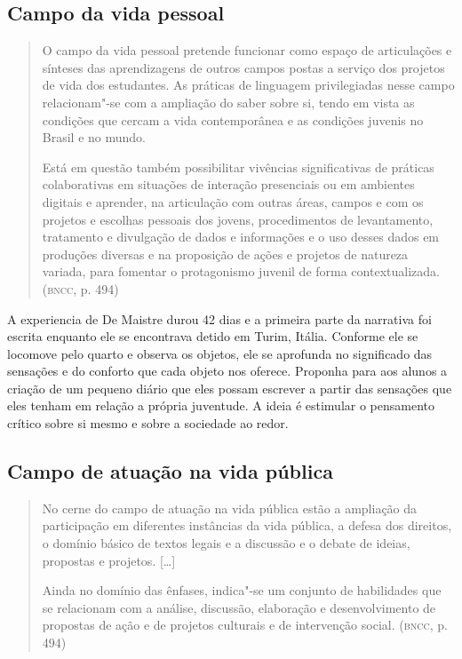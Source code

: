 \documentclass[12pt]{extarticle}
\begin{document}
\subsection{Campo da vida pessoal}

\begin{quote}
O campo da vida pessoal pretende funcionar como espaço de articulações
e sínteses das aprendizagens de outros campos postas a serviço dos
projetos de vida dos estudantes. As práticas de linguagem privilegiadas
nesse campo relacionam"-se com a ampliação do saber sobre si, tendo em
vista as condições que cercam a vida contemporânea e as condições
juvenis no Brasil e no mundo.

Está em questão também possibilitar vivências significativas de práticas
colaborativas em situações de interação presenciais ou em ambientes
digitais e aprender, na articulação com outras áreas, campos e com os
projetos e escolhas pessoais dos jovens, procedimentos de levantamento,
tratamento e divulgação de dados e informações e o uso desses dados em
produções diversas e na proposição de ações e projetos de natureza
variada, para fomentar o protagonismo juvenil de forma
contextualizada. (\textsc{bncc}, p. 494)
\end{quote}

A experiencia de De Maistre durou 42 dias e a primeira parte da
narrativa foi escrita enquanto ele se encontrava detido em Turim,
Itália. Conforme ele se locomove pelo quarto e observa os objetos, ele
se aprofunda no significado das sensações e do conforto que cada
objeto nos oferece. Proponha para aos alunos a criação de um pequeno
diário que eles possam escrever a partir das sensações que eles tenham
em relação a própria juventude. A ideia é estimular o pensamento
crítico sobre si mesmo e sobre a sociedade ao redor.


\subsection{Campo de atuação na vida pública}

\begin{quote}
No cerne do campo de atuação na vida pública estão a ampliação da
participação em diferentes instâncias da vida pública, a defesa dos
direitos, o domínio básico de textos legais e a discussão e o debate de
ideias, propostas e projetos. {[}\ldots{}{]}

Ainda no domínio das ênfases, indica"-se um conjunto de habilidades que
se relacionam com a análise, discussão, elaboração e desenvolvimento de
propostas de ação e de projetos culturais e de intervenção social.
(\textsc{bncc}, p. 494)
\end{quote}
\end{document}
